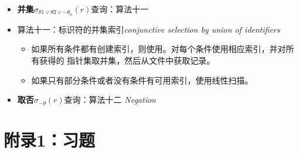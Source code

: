 \documentclass[b5paper, twoside]{article}
\let\oldtextbf\textbf
\renewcommand{\textbf}[1]{\textcolor{myblue}{\oldtextbf{#1}}}
\let\oldemph\emph
\renewcommand{\emph}[1]{\textcolor{mypink}{\oldemph{#1}}}
\begin{document}
\begin{itemize}
{	intersection of identifiers}
	\begin{itemize}
		\item 对每个条件使用相应的索引，并对所有获得的记录指针集合取交集。
		\item 如果某些条件没有合适索引，则在读到内存后再对他们进行该条件的测试。
	\end{itemize}
	\item[$\rightarrow$] \textbf{并集}$\sigma_{\theta1 \vee \theta2 \vee 
	\cdots \theta_n}(r)$查询：算法十一
	\item 算法十一：标识符的并集索引\hfill \emph{conjunctive selection by 
	union of identifiers}
	\begin{itemize}
		\item 如果所有条件都有创建索引，则使用。对每个条件使用相应索引，并对所有获得的
		指针集取并集，然后从文件中获取记录。
		\item 如果只有部分条件或者没有条件有可用索引，使用线性扫描。
	\end{itemize}
	\item[$\rightarrow$] \textbf{取否}$\sigma_{-\theta}(r)$查询：算法十二\hfill 
	\emph{Negation}
\end{itemize}

\newpage
\tableofcontents  %
\label{toc}
\appendix

\section{附录1：习题}
\end{document}
